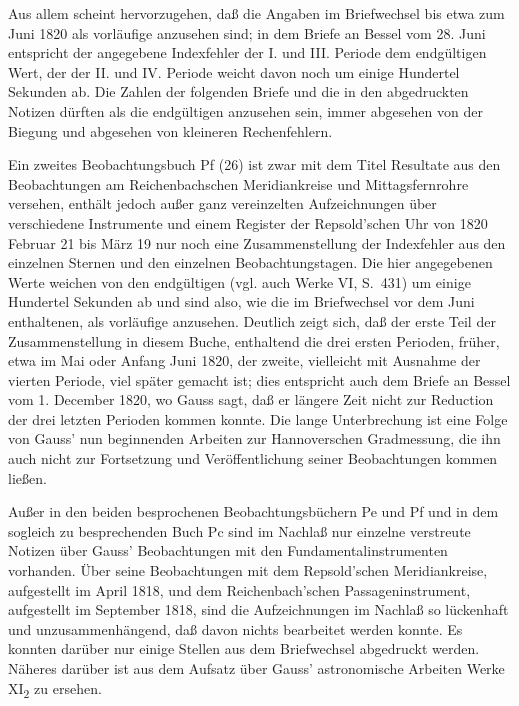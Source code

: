 \documentclass[12pt,a4paper]{article}
\theoremstyle{plain}
\theoremstyle{definition}
\theoremstyle{remark}
\begin{document}
Aus allem scheint hervorzugehen, da\ss{} die Angaben im Briefwechsel bis etwa zum Juni 1820 als vorl\"aufige anzusehen sind; in dem Briefe an Bessel vom 28. Juni entspricht der angegebene Indexfehler der I. und III. Periode dem endg\"ultigen Wert, der der II. und IV. Periode weicht davon noch um einige Hundertel Sekunden ab. Die Zahlen der folgenden Briefe und die in den abgedruckten Notizen d\"urften als die endg\"ultigen anzusehen sein, immer abgesehen von der Biegung und abgesehen von kleineren Rechenfehlern.

Ein zweites Beobachtungsbuch Pf (26) ist zwar mit dem Titel \glqq Resultate aus den Beobachtungen am Reichenbachschen Meridiankreise und Mittagsfernrohre\grqq{} versehen, enth\"alt jedoch au\ss er ganz vereinzelten Aufzeichnungen \"uber verschiedene Instrumente und einem Register der Repsold'schen Uhr von 1820 Februar 21 bis M\"arz 19 nur noch eine Zusammenstellung der Indexfehler aus den einzelnen Sternen und den einzelnen Beobachtungstagen. Die hier angegebenen Werte weichen von den endg\"ultigen (vgl. auch Werke VI, S.~431) um einige Hundertel Sekunden ab und sind also, wie die im Briefwechsel vor dem Juni enthaltenen, als vorl\"aufige anzusehen. Deutlich zeigt sich, da\ss{} der erste Teil der Zusammenstellung in diesem Buche, enthaltend die drei ersten Perioden, fr\"uher, etwa im Mai oder Anfang Juni 1820, der zweite, vielleicht mit Ausnahme der vierten Periode, viel sp\"ater gemacht ist; dies entspricht auch dem Briefe an Bessel vom 1. December 1820, wo Gauss sagt, da\ss{} er l\"angere Zeit nicht zur Reduction der drei letzten Perioden kommen konnte. Die lange Unterbrechung ist eine Folge von Gauss' nun beginnenden Arbeiten zur Hannoverschen Gradmessung, die ihn auch nicht zur Fortsetzung und Ver\"offentlichung seiner Beobachtungen kommen lie\ss en.

Au\ss er in den beiden besprochenen Beobachtungsb\"uchern Pe und Pf und in dem sogleich zu besprechenden Buch Pc sind im Nachla\ss{} nur einzelne verstreute Notizen \"uber Gauss' Beobachtungen mit den Fundamentalinstrumenten vorhanden. \"Uber seine Beobachtungen mit dem Repsold'schen Meridiankreise, aufgestellt im April 1818, und dem Reichenbach'schen Passageninstrument, aufgestellt im September 1818, sind die Aufzeichnungen im Nachla\ss{} so l\"uckenhaft und unzusammenh\"angend, da\ss{} davon nichts bearbeitet werden konnte. Es konnten dar\"uber nur einige Stellen aus dem Briefwechsel abgedruckt werden. N\"aheres dar\"uber ist aus dem Aufsatz \"uber Gauss' astronomische Arbeiten Werke XI\textsubscript{2} zu ersehen.
\end{document}
